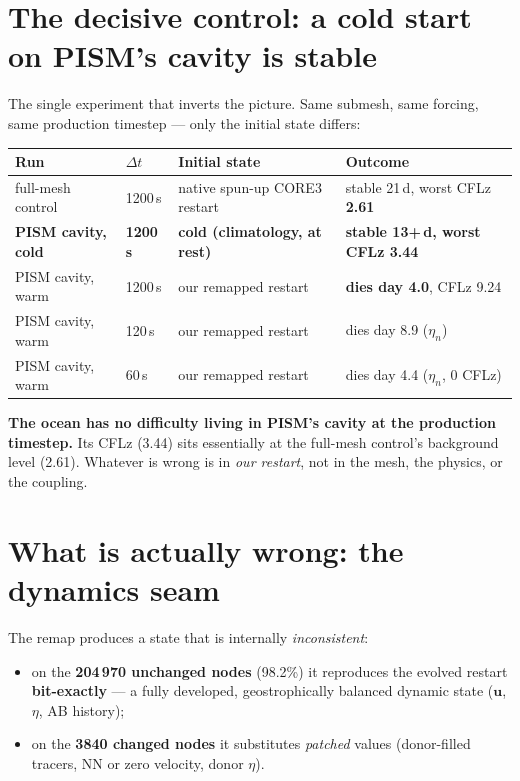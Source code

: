 \documentclass[11pt,a4paper]{article}
\begin{document}
\section{The decisive control: a cold start on PISM's cavity is stable}\label{sec:cold}

The single experiment that inverts the picture. Same submesh, same forcing, same production
timestep --- only the initial state differs:

\begin{center}
\begin{tabular}{@{}llll@{}}
\toprule
Run & $\Delta t$ & Initial state & Outcome \\
\midrule
full-mesh control & 1200\,s & native spun-up CORE3 restart & stable 21\,d, worst CFLz \textbf{2.61} \\
\textbf{PISM cavity, cold} & \textbf{1200\,s} & \textbf{cold (climatology, at rest)} &
  \textbf{stable 13+\,d, worst CFLz 3.44} \\
PISM cavity, warm & 1200\,s & our remapped restart & \textbf{dies day 4.0}, CFLz 9.24 \\
PISM cavity, warm & \phantom{0}120\,s & our remapped restart & dies day 8.9 ($\eta_n$) \\
PISM cavity, warm & \phantom{00}60\,s & our remapped restart & dies day 4.4 ($\eta_n$, 0 CFLz) \\
\bottomrule
\end{tabular}
\end{center}

\noindent
\textbf{The ocean has no difficulty living in PISM's cavity at the production timestep.} Its
CFLz (3.44) sits essentially at the full-mesh control's background level (2.61). Whatever is
wrong is in \emph{our restart}, not in the mesh, the physics, or the coupling.

\section{What is actually wrong: the dynamics seam}\label{sec:seam}

The remap produces a state that is internally \emph{inconsistent}:

\begin{itemize}
\item on the \textbf{204\,970 unchanged nodes} (98.2\%) it reproduces the evolved restart
      \textbf{bit-exactly} --- a fully developed, geostrophically balanced dynamic state
      ($\mathbf{u}$, $\eta$, AB history);
\item on the \textbf{3840 changed nodes} it substitutes \emph{patched} values (donor-filled
      tracers, NN or zero velocity, donor $\eta$).
\end{itemize}
\end{document}
